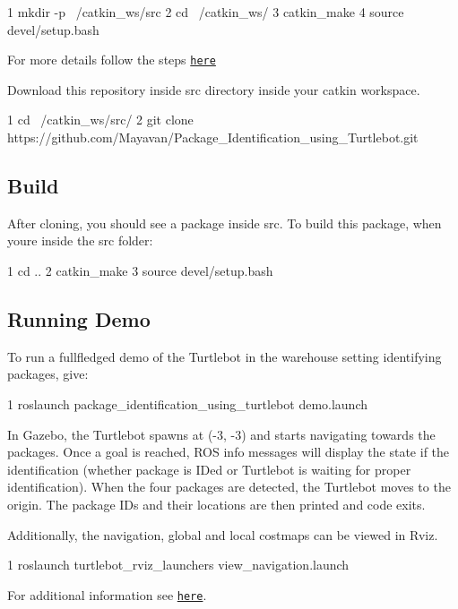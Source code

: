 \begin{DoxyCode}
1 mkdir -p ~/catkin\_ws/src
2 cd ~/catkin\_ws/
3 catkin\_make
4 source devel/setup.bash
\end{DoxyCode}
 For more details follow the steps \href{http://wiki.ros.org/catkin/Tutorials/create_a_workspace}{\tt here}

Download this repository inside src directory inside your catkin workspace. 
\begin{DoxyCode}
1 cd ~/catkin\_ws/src/
2 git clone https://github.com/Mayavan/Package\_Identification\_using\_Turtlebot.git
\end{DoxyCode}


\subsection*{Build}

After cloning, you should see a package inside src. To build this package, when you\textquotesingle{}re inside the src folder\+: 
\begin{DoxyCode}
1 cd ..
2 catkin\_make
3 source devel/setup.bash
\end{DoxyCode}


\subsection*{Running Demo}

To run a fullfledged demo of the Turtlebot in the warehouse setting identifying packages, give\+:


\begin{DoxyCode}
1 roslaunch package\_identification\_using\_turtlebot demo.launch
\end{DoxyCode}


In Gazebo, the Turtlebot spawns at (-\/3, -\/3) and starts navigating towards the packages. Once a goal is reached, R\+OS info messages will display the state if the identification (whether package is I\+Ded or Turtlebot is waiting for proper identification). When the four packages are detected, the Turtlebot moves to the origin. The package I\+Ds and their locations are then printed and code exits.

Additionally, the navigation, global and local costmaps can be viewed in Rviz. 
\begin{DoxyCode}
1 roslaunch turtlebot\_rviz\_launchers view\_navigation.launch
\end{DoxyCode}
 For additional information see \href{http://learn.turtlebot.com/2015/02/03/8/}{\tt here}. 

